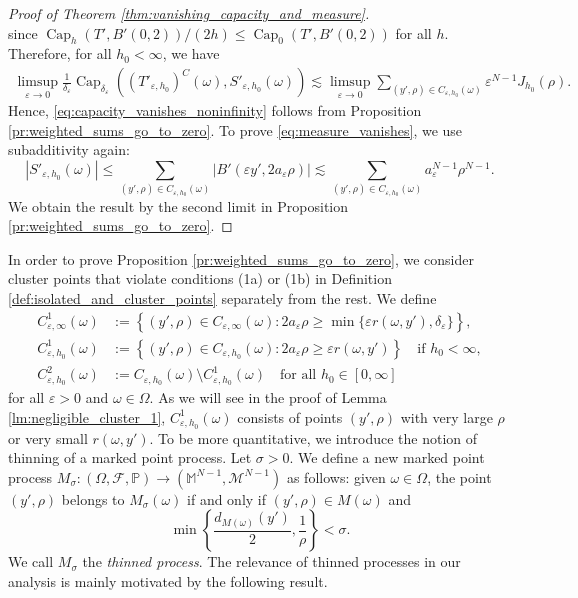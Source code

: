\documentclass{article}
\numberwithin{equation}{section}
\theoremstyle{definition}
\theoremstyle{remark}
\newcommand{\cpct}{\operatorname{Cap}}
\begin{document}
\begin{proof}[Proof of Theorem \ref{thm:vanishing_capacity_and_measure}]
\[    \]
    since $\cpct_h(T', B'(0, 2))/(2h) \le \cpct_0(T', B'(0, 2))$ for all $h$. Therefore, for all $h_0 < \infty$, we have
    \begin{gather*}
        \limsup_{\varepsilon \to 0} \frac{1}{\delta_\varepsilon} \cpct_{\delta_\varepsilon}\left((T'_{\varepsilon, h_0})^C(\omega), S'_{\varepsilon, h_0}(\omega)\right) \lesssim \limsup_{\varepsilon \to 0} \sum_{(y', \rho) \in C_{\varepsilon, h_0}(\omega)} \varepsilon^{N - 1} J_{h_0}(\rho).
    \end{gather*}
    Hence, \eqref{eq:capacity_vanishes_noninfinity} follows from Proposition \ref{pr:weighted_sums_go_to_zero}. To prove \eqref{eq:measure_vanishes}, we use subadditivity again:
    \[
    |S'_{\varepsilon, h_0}(\omega)| \le \sum_{(y', \rho) \in C_{\varepsilon, h_0}(\omega)} |B'(\varepsilon y', 2 a_\varepsilon \rho)| \lesssim \sum_{(y', \rho) \in C_{\varepsilon, h_0}(\omega)} a_\varepsilon^{N - 1} \rho^{N - 1}.
    \]
    We obtain the result by the second limit in Proposition \ref{pr:weighted_sums_go_to_zero}.
\end{proof}

In order to prove Proposition \ref{pr:weighted_sums_go_to_zero}, we consider cluster points that violate conditions (1a) or (1b) in Definition \ref{def:isolated_and_cluster_points} separately from the rest.
We define
\begin{equation} \label{eq:cluster_points_classification}
    \begin{aligned}
        C_{\varepsilon, \infty}^1(\omega) &:= \left\{(y', \rho) \in C_{\varepsilon, \infty}(\omega) : 2 a_\varepsilon \rho \ge \min \{\varepsilon r(\omega, y'), \delta_\varepsilon\} \right\}, \\
        C_{\varepsilon, h_0}^1(\omega) &:= \left\{(y', \rho) \in C_{\varepsilon, h_0}(\omega) : 2 a_\varepsilon \rho \ge \varepsilon r(\omega, y') \right\} \quad \text{if } h_0 < \infty, \\
        C_{\varepsilon, h_0}^2(\omega) &:= C_{\varepsilon, h_0}(\omega) \setminus C_{\varepsilon, h_0}^1(\omega) \quad \text{for all } h_0 \in [0, \infty]
    \end{aligned}
\end{equation}
for all $\varepsilon > 0$ and $\omega \in \Omega$. As we will see in the proof of Lemma \ref{lm:negligible_cluster_1}, $C_{\varepsilon, h_0}^1(\omega)$ consists of points $(y', \rho)$ with very large $\rho$ or very small $r(\omega, y')$. To be more quantitative, we introduce the notion of thinning of a marked point process. Let $\sigma > 0$. We define a new marked point process $M_\sigma : (\Omega, \mathcal{F}, \mathbb{P}) \rightarrow (\mathbb{M}^{N - 1}, \mathcal{M}^{N - 1})$ as follows: given $\omega \in \Omega$, the point $(y', \rho)$ belongs to $M_\sigma(\omega)$ if and only if $(y', \rho) \in M(\omega)$ and
\[
\min \left\{\frac{d_{M(\omega)}(y')}{2}, \frac{1}{\rho}\right\} < \sigma.
\]
We call $M_\sigma$ the \textit{thinned process}. The relevance of thinned processes in our analysis is mainly motivated by the following result.
\end{document}
